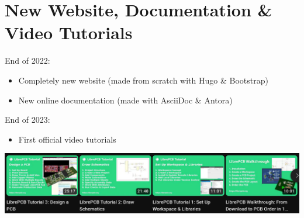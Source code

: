 \section{New Website, Documentation \& Video Tutorials}

\begin{frame}{\secname}
  End of 2022:
  \begin{itemize}
    \item Completely new website (made from scratch with Hugo \& Bootstrap)
    \item New online documentation (made with AsciiDoc \& Antora)
  \end{itemize}

  End of 2023:
  \begin{itemize}
    \item First official video tutorials
  \end{itemize}
  \includegraphics[width=\linewidth]{images/youtube.png}
\end{frame}


